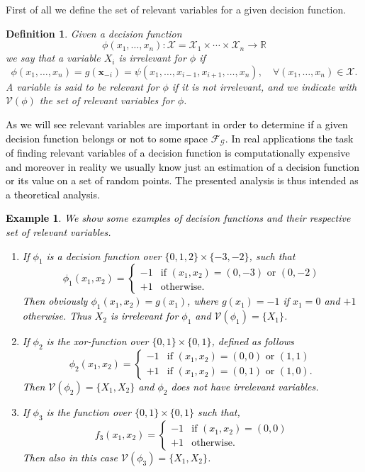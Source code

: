 \documentclass[11pt,a4paper, twoside]{book}
\newtheorem{example}{Example}[chapter]
\newtheorem{definition}{Definition}[chapter]
\newcommand{\bchi}{\boldsymbol{\mathcal{X}}}
\newcommand{\nchi}{\mathcal{X}}
\begin{document}
First of all we define the set of relevant variables for a given decision function.
\begin{definition}
Given a decision function $$\phi(x_1,\ldots,x_n): {\bchi}=\nchi_1\times\cdots\times\nchi_n \to \mathbb{R}$$ we say that a variable $X_i$ is irrelevant for $\phi$ if 
$$ \phi(x_1,\ldots,x_n)=g(\mathbf{x}_{-i})=\psi(x_1,\ldots,x_{i-1},x_{i+1},\ldots,x_n), \quad \forall (x_1,\ldots,x_n) \in {\bchi}.$$
A variable is said to be relevant for $\phi$ if it is not irrelevant, and we indicate with $\mathcal{V}(\phi)$ the set of relevant variables for $\phi$.
\end{definition}
\textcolor{black}{As we will see relevant variables are important in order to determine if a given decision function belongs or not to some space $\mathcal{F}_{\mathcal{G}}$. In real applications the task of finding relevant variables of a decision function is computationally expensive and moreover in reality we usually know just an estimation of a decision function or its value on a set of random points. The presented analysis is thus intended as a theoretical analysis.}
\textcolor{black}{\begin{example}
We show some examples of decision functions and their respective set of relevant variables.
\begin{enumerate}
\item If $\phi_1$ is a decision function over $\{0,1,2\}\times \{-3,-2\}$, such that
$$ \phi_1(x_1,x_2)=\begin{cases}
    -1 & \text{if } (x_1,x_2)=(0,-3) \text{ or } (0,-2) \\
    +1 & \text{otherwise}.
\end{cases}$$
Then obviously $\phi_1(x_1,x_2)=g(x_1)$, where $g(x_1)=-1$ if $x_1=0$ and $+1$ otherwise. Thus $X_2$ is irrelevant for $\phi_1$ and $\mathcal{V}(\phi_1)=\{X_1\}$.
\item If $\phi_2$ is the xor-function over $\{0,1\}\times\{0,1\}$, defined as follows
$$ \phi_2(x_1,x_2)=\begin{cases}
    -1 & \text{if } (x_1,x_2)=(0,0) \text{ or } (1,1) \\
    +1 & \text{if } (x_1,x_2)=(0,1) \text{ or } (1,0).
\end{cases}$$
Then $\mathcal{V}(\phi_2)=\{X_1,X_2\}$ and $\phi_2$ does not have irrelevant variables.
\item If $\phi_3$ is the function over $\{0,1\}\times\{0,1\}$ such that,
$$ f_3(x_1,x_2)=\begin{cases}
    -1 & \text{if } (x_1,x_2)=(0,0)  \\
    +1 & \text{otherwise} .
\end{cases}$$
Then also in this case $\mathcal{V}(\phi_3)=\{X_1,X_2\}$.
\end{enumerate}
\label{exp:relevant}
\end{example}}
\end{document}
